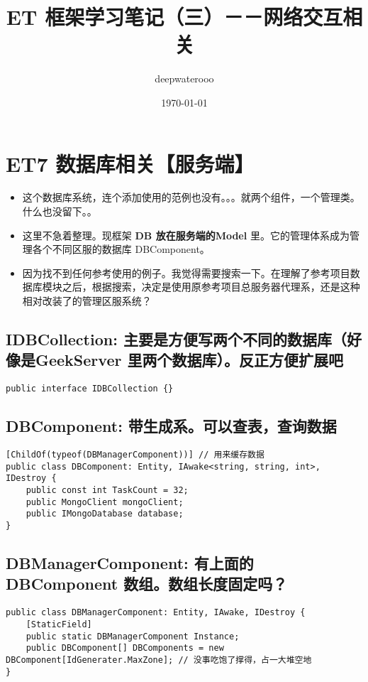 \documentclass[9pt, b5paper]{article}
\author{deepwaterooo}
\date{\today}
\title{ET 框架学习笔记（三）－－网络交互相关}
\begin{document}
\maketitle
\tableofcontents


\section{ET7 数据库相关【服务端】}
\label{sec-1}
\begin{itemize}
\item 这个数据库系统，连个添加使用的范例也没有。。。就两个组件，一个管理类。什么也没留下。。
\item 这里不急着整理。现框架 \textbf{DB 放在服务端的Model} 里。它的管理体系成为管理各个不同区服的数据库 DBComponent。
\item 因为找不到任何参考使用的例子。我觉得需要搜索一下。在理解了参考项目数据库模块之后，根据搜索，决定是使用原参考项目总服务器代理系，还是这种相对改装了的管理区服系统？
\end{itemize}
\subsection{IDBCollection: 主要是方便写两个不同的数据库（好像是GeekServer 里两个数据库）。反正方便扩展吧}
\label{sec-1-1}
\begin{verbatim}
public interface IDBCollection {}
\end{verbatim}
\subsection{DBComponent: 带生成系。可以查表，查询数据}
\label{sec-1-2}
\begin{verbatim}
[ChildOf(typeof(DBManagerComponent))] // 用来缓存数据
public class DBComponent: Entity, IAwake<string, string, int>, IDestroy {
    public const int TaskCount = 32;
    public MongoClient mongoClient;
    public IMongoDatabase database;
}
\end{verbatim}
\subsection{DBManagerComponent: 有上面的 DBComponent 数组。数组长度固定吗？}
\label{sec-1-3}
\begin{verbatim}
public class DBManagerComponent: Entity, IAwake, IDestroy {
    [StaticField]
    public static DBManagerComponent Instance;
    public DBComponent[] DBComponents = new DBComponent[IdGenerater.MaxZone]; // 没事吃饱了撑得，占一大堆空地
}
\end{verbatim}
\end{document}
